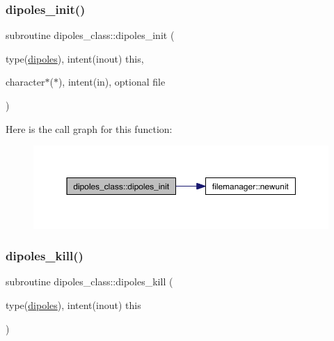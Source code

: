 \mbox{\label{namespacedipoles__class_a947aef5d45c6e39accc6c0e20f619c57}} 
\subsubsection{\texorpdfstring{dipoles\+\_\+init()}{dipoles\_init()}}
{\footnotesize\ttfamily subroutine dipoles\+\_\+class\+::dipoles\+\_\+init (\begin{DoxyParamCaption}\item[{type(\hyperlink{structdipoles__class_1_1dipoles}{dipoles}), intent(inout)}]{this,  }\item[{character$\ast$($\ast$), intent(in), optional}]{file }\end{DoxyParamCaption})\hspace{0.3cm}{\ttfamily [private]}}

Here is the call graph for this function\+:\nopagebreak
\begin{figure}[H]
\begin{center}
\leavevmode
\includegraphics[width=350pt]{namespacedipoles__class_a947aef5d45c6e39accc6c0e20f619c57_cgraph}
\end{center}
\end{figure}
\mbox{\label{namespacedipoles__class_ab610221599ac72fa22a02617e550033b}} 
\subsubsection{\texorpdfstring{dipoles\+\_\+kill()}{dipoles\_kill()}}
{\footnotesize\ttfamily subroutine dipoles\+\_\+class\+::dipoles\+\_\+kill (\begin{DoxyParamCaption}\item[{type(\hyperlink{structdipoles__class_1_1dipoles}{dipoles}), intent(inout)}]{this }\end{DoxyParamCaption})\hspace{0.3cm}{\ttfamily [private]}}

